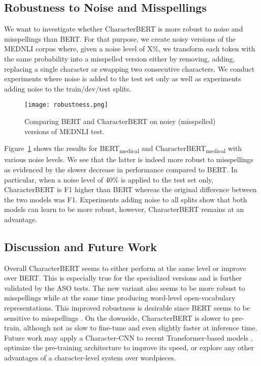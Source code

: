 \documentclass[11pt]{article}
\begin{document}
\subsection{Robustness to Noise and Misspellings}

We want to investigate whether CharacterBERT is more robust to noise and misspellings than BERT. For that purpose, we create noisy versions of the MEDNLI corpus where, given a noise level of X\%, we transform each token with the same probability into a misspelled version either by removing, adding, replacing a single character or swapping two consecutive characters. We conduct experiments where noise is added to the test set only as well as experiments adding noise to the train/dev/test splits.

\begin{figure}[htpb]
\begin{center} 
\texttt{[image: robustness.png]}
\end{center} 
\caption{Comparing BERT and CharacterBERT on noisy (misspelled) versions of MEDNLI test.} \label{robustness}
\end{figure}

Figure~\ref{robustness} shows the results for BERT\textsubscript{medical} and CharacterBERT\textsubscript{medical} with various noise levels. We see that the latter is indeed more robust to misspellings as evidenced by the slower decrease in performance compared to BERT. In particular, when a noise level of 40\% is applied to the test set only, CharacterBERT is  F1 higher than BERT whereas the original difference between the two models was  F1. Experiments adding noise to all splits show that both models can learn to be more robust, however, CharacterBERT remains at an advantage.

\subsection{Discussion and Future Work}

Overall CharacterBERT seems to either perform at the same level or improve over BERT. This is especially true for the specialized versions and is further validated by the ASO tests. The new variant also seems to be more robust to misspellings while at the same time producing word-level open-vocabulary representations. This improved robustness is desirable since BERT seems to be sensitive to misspellings \cite{pruthi-etal-2019-combating,sun2020adv}. On the downside, CharacterBERT is slower to pre-train, although not as slow to fine-tune and even slightly faster at inference time. Future work may apply a Character-CNN to recent Transformer-based models \cite{lan2019albert,sun2019ernie}, optimize the pre-training architecture to improve its speed, or explore any other advantages of a character-level system over wordpieces.
\end{document}
